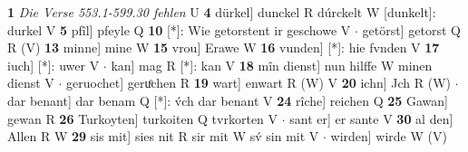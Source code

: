 \documentclass[8pt,a4paper,notitlepage]{article}
\begin{document}
\begin{table}[ht]
\begin{minipage}[t]{0.5\linewidth}
\textbf{1} \textit{Die Verse 553.1-599.30 fehlen} U  \textbf{4} dürkel] dunckel R dúrckelt W [dunkelt]: durkel V \textbf{5} pfîl] pfeyle Q \textbf{10} [*]: Wie getorstent ir geschowe V  $\cdot$ getörst] getorst Q R (V) \textbf{13} minne] mine W \textbf{15} vrou] Erawe W \textbf{16} vunden] [*]: hie fvnden V \textbf{17} iuch] [*]: uwer V  $\cdot$ kan] mag R [*]: kan V \textbf{18} mîn dienst] nun hilffe W minen dienst V  $\cdot$ geruochet] geruͦchen R \textbf{19} wart] enwart R (W) V \textbf{20} ichn] Jch R (W)  $\cdot$ dar benant] dar benam Q [*]: v́ch dar benant V \textbf{24} rîche] reichen Q \textbf{25} Gawan] gewan R \textbf{26} Turkoyten] turkoiten Q tvrkorten V  $\cdot$ sant er] er sante V \textbf{30} al den] Allen R W \textbf{29} sis mit] sies nit R sir mit W sv́ sin mit V  $\cdot$ wirden] wirde W (V) \newline
\end{minipage}
\end{table}
\end{document}
